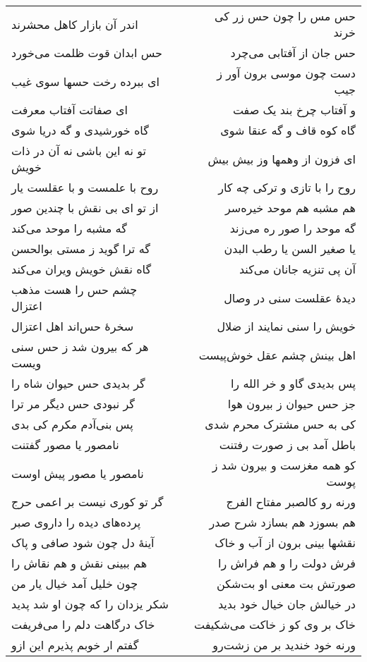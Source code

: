 \begin{center}
\begin{longtable}{l p{0.5cm} r}
اندر آن بازار کاهل محشرند
&&
حس مس را چون حس زر کی خرند
\\
حس ابدان قوت ظلمت می‌خورد
&&
حس جان از آفتابی می‌چرد
\\
ای ببرده رخت حسها سوی غیب
&&
دست چون موسی برون آور ز جیب
\\
ای صفاتت آفتاب معرفت
&&
و آفتاب چرخ بند یک صفت
\\
گاه خورشیدی و گه دریا شوی
&&
گاه کوه قاف و گه عنقا شوی
\\
تو نه این باشی نه آن در ذات خویش
&&
ای فزون از وهمها وز بیش بیش
\\
روح با علمست و با عقلست یار
&&
روح را با تازی و ترکی چه کار
\\
از تو ای بی نقش با چندین صور
&&
هم مشبه هم موحد خیره‌سر
\\
گه مشبه را موحد می‌کند
&&
گه موحد را صور ره می‌زند
\\
گه ترا گوید ز مستی بوالحسن
&&
یا صغیر السن یا رطب البدن
\\
گاه نقش خویش ویران می‌کند
&&
آن پی تنزیه جانان می‌کند
\\
چشم حس را هست مذهب اعتزال
&&
دیدهٔ عقلست سنی در وصال
\\
سخرهٔ حس‌اند اهل اعتزال
&&
خویش را سنی نمایند از ضلال
\\
هر که بیرون شد ز حس سنی ویست
&&
اهل بینش چشم عقل خوش‌پیست
\\
گر بدیدی حس حیوان شاه را
&&
پس بدیدی گاو و خر الله را
\\
گر نبودی حس دیگر مر ترا
&&
جز حس حیوان ز بیرون هوا
\\
پس بنی‌آدم مکرم کی بدی
&&
کی به حس مشترک محرم شدی
\\
نامصور یا مصور گفتنت
&&
باطل آمد بی ز صورت رفتنت
\\
نامصور یا مصور پیش اوست
&&
کو همه مغزست و بیرون شد ز پوست
\\
گر تو کوری نیست بر اعمی حرج
&&
ورنه رو کالصبر مفتاح الفرج
\\
پرده‌های دیده را داروی صبر
&&
هم بسوزد هم بسازد شرح صدر
\\
آینهٔ دل چون شود صافی و پاک
&&
نقشها بینی برون از آب و خاک
\\
هم ببینی نقش و هم نقاش را
&&
فرش دولت را و هم فراش را
\\
چون خلیل آمد خیال یار من
&&
صورتش بت معنی او بت‌شکن
\\
شکر یزدان را که چون او شد پدید
&&
در خیالش جان خیال خود بدید
\\
خاک درگاهت دلم را می‌فریفت
&&
خاک بر وی کو ز خاکت می‌شکیفت
\\
گفتم ار خوبم پذیرم این ازو
&&
ورنه خود خندید بر من زشت‌رو

\end{longtable}
\end{center}
